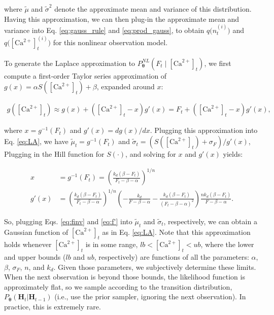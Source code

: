 \documentclass[10pt]{article}
\providecommand{\ve}[1]{\boldsymbol{#1}}
\providecommand{\ve}[1]{\boldsymbol{#1}}
\newcommand{\thetn}{\ve{\theta}}
\newcommand{\p}{P_{\thetn}}
\newcommand{\Ca}{[\text{Ca}^{2+}]}
\begin{document}
\noindent where $\widetilde{\mu}$ and $\widetilde{\sigma}^2$ denote the approximate mean and variance of this distribution. Having this approximation, we can then plug-in the approximate mean and variance into Eq. \ref{eq:gauss_rule} and \ref{eq:prod_gauss}, to obtain $q\big(n_t^{(i)}\big)$ and $q\big(\Ca_t^{(i)}\big)$ for this nonlinear observation model.

To generate the Laplace approximation to $\p^{NL}(F_t \mid \Ca_t)$, we first compute a first-order Taylor series approximation of $g(x)=\alpha S(\Ca_t)+\beta$, expanded around $x$:

\begin{align}
g(\Ca_t) \approx g(x) + (\Ca_t - x) g'(x) = F_t + (\Ca_t - x) g'(x),
\end{align}

\noindent where $x = g^{-1}(F_t)$ and $g'(x)=dg(x)/dx$. Plugging this approximation into Eq. \ref{eq:LA}, we have $\widetilde{\mu}_t=g^{-1}(F_t)$ and $\widetilde{\sigma}_t=(S(\Ca_t)+\sigma_F)/g'(x)$, 
%
%
Plugging in the Hill function for $S(\cdot)$, and solving for $x$ and $g'(x)$ yields:

\begin{align} \label{eq:finv}
x &= g^{-1}(F_t) =  \left(\frac{k_d (\beta - F_t)}{F_t - \beta - \alpha}\right)^{1/n}\\ \label{eq:f'}
g'(x) &= \left(\frac{k_d (\beta -F_t)}{F_t - \beta - \alpha}\right)^{1/n} \left(-\frac{k_d}{F-\beta-\alpha}-\frac{k_d(\beta-F_t)}{(F_t-\beta-\alpha)^2}\right) \frac{n k_d (\beta - F_t)}{F-\beta-\alpha}.
\end{align}

\noindent So, plugging Eqs. \ref{eq:finv} and \ref{eq:f'} into $\widetilde{\mu}_t$ and $\widetilde{\sigma}_t$, respectively, we can obtain a Gaussian function of $\Ca_t$ as in Eq. \ref{eq:LA}. Note that this approximation holds whenever $\Ca_t$ is in some range, $lb<\Ca_t<ub$, where the lower and upper bounds ($lb$ and $ub$, respectively) are functions of all the parameters: $\alpha$, $\beta$, $\sigma_F$, $n$, and $k_d$. Given those parameters, we subjectively determine these limits.  When the next observation is beyond those bounds, the likelihood function is approximately flat, so we sample according to the transition distribution, $\p(\ve{H}_t | \ve{H}_{t-1})$  (i.e., use the prior sampler, ignoring the next observation).  In practice, this is extremely rare.
\end{document}
